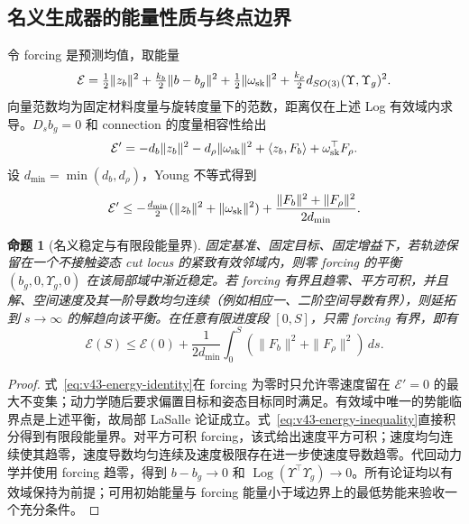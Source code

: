 \documentclass[11pt,a4paper]{article}
\numberwithin{equation}{section}
\newtheorem{proposition}[theorem]{命题}
\theoremstyle{definition}
\begin{document}
\subsection{名义生成器的能量性质与终点边界}
令 forcing 是预测均值，取能量
\begin{equation}
 \mathcal E=\tfrac12\|z_b\|^2+
 \tfrac{k_b}{2}\|b-b_g\|^2+
 \tfrac12\|\omega_{\rm sk}\|^2+
 \tfrac{k_\rho}{2}d_{SO(3)}(\Upsilon,\Upsilon_g)^2.
 \label{eq:v43-skill-energy}
\end{equation}
向量范数均为固定材料度量与旋转度量下的范数，距离仅在上述 Log 有效域内求导。$D_sb_g=0$ 和 connection 的度量相容性给出
\begin{equation}
 \mathcal E'=-d_b\|z_b\|^2-d_\rho\|\omega_{\rm sk}\|^2
               +\langle z_b,F_b\rangle+\omega_{\rm sk}^\top F_\rho.
 \label{eq:v43-energy-identity}
\end{equation}
设 $d_{\min}=\min(d_b,d_\rho)$，Young 不等式得到
\begin{equation}
 \mathcal E'\le -\tfrac{d_{\min}}2
          (\|z_b\|^2+\|\omega_{\rm sk}\|^2)
             +\frac{\|F_b\|^2+\|F_\rho\|^2}{2d_{\min}}.
 \label{eq:v43-energy-inequality}
\end{equation}

\begin{proposition}[名义稳定与有限段能量界]
\label{prop:v43-nominal-skill}
固定基准、固定目标、固定增益下，若轨迹保留在一个不接触姿态 cut locus 的紧致有效邻域内，则零 forcing 的平衡 $(b_g,0,\Upsilon_g,0)$ 在该局部域中渐近稳定。若 forcing 有界且趋零、平方可积，并且解、空间速度及其一阶导数均匀连续（例如相应一、二阶空间导数有界），则延拓到 $s\to\infty$ 的解趋向该平衡。在任意有限进度段 $[0,S]$，只需 forcing 有界，即有
\begin{equation}
 \mathcal E(S)\le\mathcal E(0)+
  \frac1{2d_{\min}}\int_0^S
     (\|F_b\|^2+\|F_\rho\|^2)\,ds.
 \label{eq:v43-finite-energy}
\end{equation}
\end{proposition}
\begin{proof}
式~\eqref{eq:v43-energy-identity}在 forcing 为零时只允许零速度留在 $\mathcal E'=0$ 的最大不变集；动力学随后要求偏置目标和姿态目标同时满足。有效域中唯一的势能临界点是上述平衡，故局部 LaSalle 论证成立。式~\eqref{eq:v43-energy-inequality}直接积分得到有限段能量界。对平方可积 forcing，该式给出速度平方可积；速度均匀连续使其趋零，速度导数均匀连续及速度极限存在进一步使速度导数趋零。代回动力学并使用 forcing 趋零，得到 $b-b_g\to0$ 和 $\operatorname{Log}(\Upsilon^\top\Upsilon_g)\to0$。所有论证均以有效域保持为前提；可用初始能量与 forcing 能量小于域边界上的最低势能来验收一个充分条件。
\end{proof}
\end{document}
